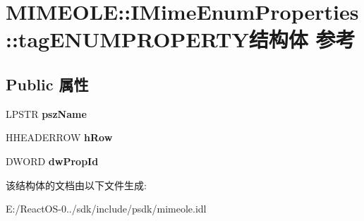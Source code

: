 \hypertarget{struct_m_i_m_e_o_l_e_1_1_i_mime_enum_properties_1_1tag_e_n_u_m_p_r_o_p_e_r_t_y}{}\section{M\+I\+M\+E\+O\+LE\+:\+:I\+Mime\+Enum\+Properties\+:\+:tag\+E\+N\+U\+M\+P\+R\+O\+P\+E\+R\+T\+Y结构体 参考}
\label{struct_m_i_m_e_o_l_e_1_1_i_mime_enum_properties_1_1tag_e_n_u_m_p_r_o_p_e_r_t_y}
\subsection*{Public 属性}
\begin{DoxyCompactItemize}
\item 
\mbox{\label{struct_m_i_m_e_o_l_e_1_1_i_mime_enum_properties_1_1tag_e_n_u_m_p_r_o_p_e_r_t_y_a7a466a2439071a35876e10ff75e993a7}} 
L\+P\+S\+TR {\bfseries psz\+Name}
\item 
\mbox{\label{struct_m_i_m_e_o_l_e_1_1_i_mime_enum_properties_1_1tag_e_n_u_m_p_r_o_p_e_r_t_y_a5e1c4d0e33eddff767022811171503b0}} 
H\+H\+E\+A\+D\+E\+R\+R\+OW {\bfseries h\+Row}
\item 
\mbox{\label{struct_m_i_m_e_o_l_e_1_1_i_mime_enum_properties_1_1tag_e_n_u_m_p_r_o_p_e_r_t_y_a55c46e429dc39918f31a0c55403b26fd}} 
D\+W\+O\+RD {\bfseries dw\+Prop\+Id}
\end{DoxyCompactItemize}


该结构体的文档由以下文件生成\+:\begin{DoxyCompactItemize}
\item 
E\+:/\+React\+O\+S-\/0../sdk/include/psdk/mimeole.\+idl\end{DoxyCompactItemize}
